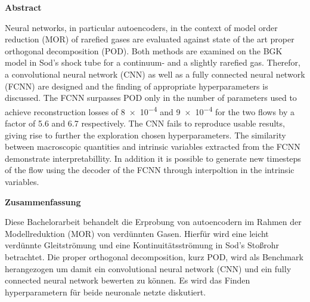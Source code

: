 

%
%
{
\pagestyle{empty}
\begin{center}
{\sffamily \bfseries\Large Abstract}\\
\end{center}%
\vspace{1cm}
%
Neural networks, in particular autoencoders, in the context of model order reduction (MOR) of rarefied gases are evaluated against state of the art proper orthogonal decomposition (POD). Both methods are examined on the BGK model in Sod's shock tube for a continuum- and a slightly rarefied gas. Therefor, a convolutional neural network (CNN) as well as a fully connected neural network (FCNN) are designed and the finding of appropriate hyperparameters is discussed. The FCNN surpasses POD only in the number of parameters used to achieve reconstruction losses of \num{8e-4} and \num{9e-4} for the two flows by a factor of 5.6 and 6.7 respectively. The CNN fails to reproduce usable results, giving rise to further the exploration chosen hyperparameters. The similarity between macroscopic quantities and intrinsic variables extracted from the FCNN demonstrate interpretabillity. In addition it is possible to generate new timesteps of the flow using the decoder of the FCNN through interpoltion in the intrinsic variables.         
\vspace{1.5cm}

%
\begin{center}
{\sffamily \bfseries\Large Zusammenfassung}\\
\end{center}%
\vspace{1cm}
%
Diese Bachelorarbeit behandelt die Erprobung von autoencodern im Rahmen der Modellreduktion (MOR) von verdünnten Gasen. Hierfür wird eine leicht verdünnte Gleitströmung und eine Kontinuitätsströmung in Sod's Stoßrohr betrachtet. Die proper orthogonal decomposition, kurz POD, wird als Benchmark herangezogen um damit ein convolutional neural network (CNN) und ein fully connected neural network bewerten zu können. Es wird das Finden hyperparametern für beide neuronale netzte diskutiert.   

\newpage
\pagestyle{plain}
}